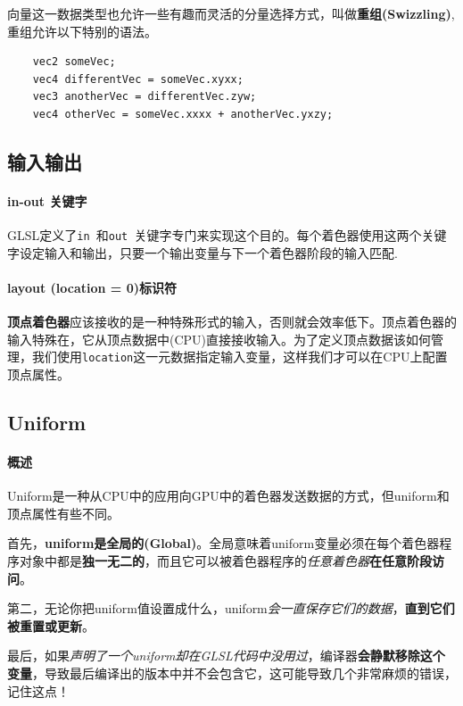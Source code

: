 \documentclass[UTF8,a4paper,12pt]{ctexbook}
\begin{document}
			向量这一数据类型也允许一些有趣而灵活的分量选择方式，叫做\textbf{重组(Swizzling)},重组允许以下特别的语法。
			\begin{lstlisting}
	vec2 someVec;
	vec4 differentVec = someVec.xyxx;
	vec3 anotherVec = differentVec.zyw;
	vec4 otherVec = someVec.xxxx + anotherVec.yxzy;			
			\end{lstlisting}
			
			
		\subsection{输入输出}
			
			\paragraph{in-out 关键字}
				GLSL定义了\verb|in |和\verb|out |关键字专门来实现这个目的。每个着色器使用这两个关键字设定输入和输出，只要一个输出变量与下一个着色器阶段的输入匹配.
			
			\paragraph{layout (location = 0)标识符}
				\textbf{顶点着色器}应该接收的是一种特殊形式的输入，否则就会效率低下。顶点着色器的输入特殊在，它从顶点数据中(CPU)直接接收输入。为了定义顶点数据该如何管理，我们使用\verb|location|这一元数据指定输入变量，这样我们才可以在CPU上配置顶点属性。
			
			
		
		\subsection{Uniform}
		
			\paragraph{概述}
				Uniform是一种从CPU中的应用向GPU中的着色器发送数据的方式，但uniform和顶点属性有些不同。
				
				首先，\textbf{uniform是全局的(Global)}。全局意味着uniform变量必须在每个着色器程序对象中都是\textbf{独一无二的}，而且它可以被着色器程序的\textit{任意着色器}\textbf{在任意阶段访问}。
				
				第二，无论你把uniform值设置成什么，uniform\textit{会一直保存它们的数据}，\textbf{直到它们被重置或更新}。
			
			
				最后，如果\textit{声明了一个uniform却在GLSL代码中没用过}，编译器\textbf{会静默移除这个变量}，导致最后编译出的版本中并不会包含它，这可能导致几个非常麻烦的错误，记住这点！
			
\end{document}
